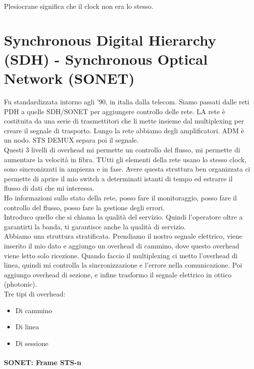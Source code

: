 Plesiocrane significa che il clock non era lo stesso. 

\section{Synchronous Digital Hierarchy (SDH) - Synchronous Optical Network (SONET)}
Fu standardizzata intorno agli '90, in italia dalla telecom. Siamo passati dalle reti PDH a quelle SDH/SONET per aggiungere controllo delle rete. LA rete è costituita da una serie di trasmettitori che li mette insieme dal multiplexing per creare il segnale di trasporto. Lungo la rete abbiamo degli amplificatori. ADM è un nodo.
STS DEMUX separa poi il segnale.\\

Questi 3 livelli di overhead mi permette un controllo del flusso, mi permette di aumentare la velocità in fibra. TUtti gli elementi della rete usano lo stesso clock, sono sincronizzati in ampiezza e in fase. Avere questa struttura ben organizzata ci permette di aprire il mio switch a determinati istanti di tempo ed estrarre il flusso di dati che mi interessa.\\

Ho informazioni sullo stato della rete, posso fare il monitoraggio, posso fare il controllo del flusso, posso fare la gestione degli errori.\\

Introduco quello che si chiama la qualità del servizio. Quindi l'operatore oltre a garantirti la banda, ti garantisce anche la qualità di servizio.\\

Abbiamo una struttura stratificata. Prendiamo il nostro segnale elettrico, viene inserito il mio dato e aggiungo un overhead di cammino, dove questo overhead viene letto solo ricezione. Quando faccio il multiplexing ci metto l'overhead di linea, quindi mi controlla la sincronizzazione e l'errore nella comunicazione. Poi aggiungo overhead di sezione, e infine trasformo il segnale elettrico in ottico (photonic).\\

Tre tipi di overhead:
\begin{itemize}
    \item Di cammino
    \item Di linea
    \item Di sessione
\end{itemize}

\paragraph{SONET: Frame STS-n}

